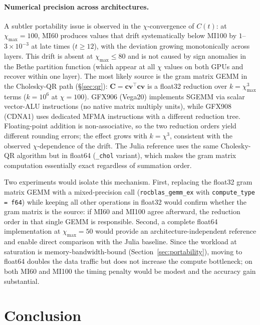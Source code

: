\documentclass[11pt]{article}
\newcommand{\chimax}{\chi_{\mathrm{max}}}
\begin{document}
\paragraph{Numerical precision across architectures.}
A subtler portability issue is observed in the $\chi$-convergence of $C(t)$:
at $\chimax=100$, MI60 produces values that drift systematically below MI100
by $1$--$3\times10^{-3}$ at late times ($t \geq 12$), with the deviation growing
monotonically across layers.
This drift is absent at $\chimax \leq 80$ and is not caused by sign anomalies
in the Bethe partition function (which appear at all $\chi$ values on both GPUs
and recover within one layer).
The most likely source is the gram matrix GEMM in the Cholesky-QR path
(\S\ref{sec:qr}): $\mathbf{C} = \mathbf{cv}^\top \mathbf{cv}$ is a float32
reduction over $k = \chimax^3$ terms ($k = 10^6$ at $\chi=100$).
GFX906 (Vega20) implements SGEMM via scalar vector-ALU instructions (no
native matrix multiply units), while GFX908 (CDNA1) uses dedicated MFMA
instructions with a different reduction tree.
Floating-point addition is non-associative, so the two reduction orders
yield different rounding errors; the effect grows with $k = \chi^3$, consistent
with the observed $\chi$-dependence of the drift.
The Julia reference uses the same Cholesky-QR algorithm but in float64
(\texttt{\_chol} variant), which makes the gram matrix computation essentially
exact regardless of summation order.

Two experiments would isolate this mechanism.
First, replacing the float32 gram matrix GEMM with a mixed-precision call
(\texttt{rocblas\_gemm\_ex} with \texttt{compute\_type = f64}) while keeping
all other operations in float32 would confirm whether the gram matrix is the
source: if MI60 and MI100 agree afterward, the reduction order in that single
GEMM is responsible.
Second, a complete float64 implementation at $\chimax=50$ would provide an
architecture-independent reference and enable direct comparison with the Julia
baseline.
Since the workload at saturation is memory-bandwidth-bound
(Section~\ref{sec:portability}), moving to float64 doubles the data traffic but does
not increase the compute bottleneck; on both MI60 and MI100 the timing penalty
would be modest and the accuracy gain substantial.


\section{Conclusion}
\label{sec:conclusion}
\end{document}
